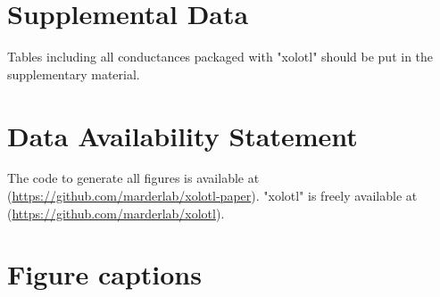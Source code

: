 \documentclass{frontiersSCNS} %
\begin{document}
\section*{Supplemental Data}
Tables including all conductances packaged with "xolotl" should be put in the supplementary material.

\section*{Data Availability Statement}

The code to generate all figures is available at (\url{https://github.com/marderlab/xolotl-paper}). "xolotl" is freely available at (\url{https://github.com/marderlab/xolotl}).

%
%
%
%
%
%

\printbibliography

%
%
%
%
%
%


\section*{Figure captions}

\FloatBarrier
\end{document}
